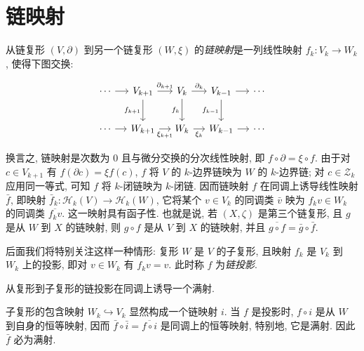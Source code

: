 \section{{链映射}}\label{sec:chain-maps}

{从链复形 $(V,\partial)$ 到另一个链复形 $(W,\xi)$ 的\emph{链映射}是一列线性映射 $f_k:V_k\to W_k$, 使得下图交换:}

\[
\begin{tikzcd}[column sep=1.2em,row sep=2.2em]
\cdots \arrow[r] & V_{k+1} \arrow[r,"\partial_{k+1}"] \arrow[d,"f_{k+1}"'] & V_k \arrow[r,"\partial_k"] \arrow[d,"f_k"'] & V_{k-1} \arrow[r] \arrow[d,"f_{k-1}"'] & \cdots \\
\cdots \arrow[r] & W_{k+1} \arrow[r,"\xi_{k+1}"'] & W_k \arrow[r,"\xi_k"'] & W_{k-1} \arrow[r] & \cdots
\end{tikzcd}
\]

{换言之, 链映射是次数为 0 且与微分交换的分次线性映射, 即 $f\circ\partial=\xi\circ f$. 由于对 $c\in V_{k+1}$ 有 $f(\partial c)=\xi f(c)$, $f$ 将 $V$ 的 $k$-边界链映为 $W$ 的 $k$-边界链; 对 $c\in\mathcal Z_k$ 应用同一等式, 可知 $f$ 将 $k$-闭链映为 $k$-闭链. 因而链映射 $f$ 在同调上诱导线性映射 $\bar f$, 即映射 $\bar f_k:\mathcal H_k(V)\to\mathcal H_k(W)$, 它将某个 $v\in V_k$ 的同调类 $\bar v$ 映为 $f_kv\in W_k$ 的同调类 $\overline{f_kv}$. 这一映射具有函子性. 也就是说, 若 $(X,\zeta)$ 是第三个链复形, 且 $g$ 是从 $W$ 到 $X$ 的链映射, 则 $g\circ f$ 是从 $V$ 到 $X$ 的链映射, 并且 $\overline{g\circ f}=\bar g\circ\bar f$.}

{后面我们将特别关注这样一种情形: 复形 $W$ 是 $V$ 的子复形, 且映射 $f_k$ 是 $V_k$ 到 $W_k$ 上的投影, 即对 $v\in W_k$ 有 $f_kv=v$. 此时称 $f$ 为\emph{链投影}.}

\begin{Proposition}\label{prop:chain-projection-homology-surjection}
{从复形到子复形的链投影在同调上诱导一个满射.}
\end{Proposition}

\begin{Proof}
{子复形的包含映射 $W_k\hookrightarrow V_k$ 显然构成一个链映射 $i$. 当 $f$ 是投影时, $f\circ i$ 是从 $W$ 到自身的恒等映射, 因而 $\bar f\circ\bar i=\overline{f\circ i}$ 是同调上的恒等映射, 特别地, 它是满射. 因此 $\bar f$ 必为满射.}
\end{Proof}

